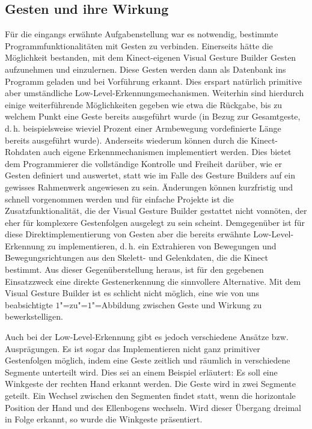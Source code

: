 \subsection{Gesten und ihre Wirkung}\label{sec:gesten}
Für die eingangs erwähnte Aufgabenstellung war es notwendig, bestimmte Programmfunktionalitäten mit Gesten zu verbinden. Einerseits hätte die Möglichkeit bestanden, mit dem Kinect-eigenen Visual Gesture Builder Gesten aufzunehmen und einzulernen. Diese Gesten werden dann als Datenbank ins Programm geladen und bei Vorführung erkannt. Dies erspart natürlich primitive aber umständliche Low-Level-Erkennungsmechanismen. Weiterhin sind hierdurch einige weiterführende Möglichkeiten gegeben wie etwa die Rückgabe, bis zu welchem Punkt eine Geste bereits ausgeführt wurde (in Bezug zur Gesamtgeste, d.\,h. beispielsweise wieviel Prozent einer Armbewegung vordefinierte Länge bereits ausgeführt wurde). Anderseits wiederum können durch die Kinect-Rohdaten auch eigene Erkennmechanismen implementiert werden. Dies bietet dem Programmierer die vollständige Kontrolle und Freiheit darüber, wie er Gesten definiert und auswertet, statt wie im Falle des Gesture Builders auf ein gewisses Rahmenwerk angewiesen zu sein. Änderungen können kurzfristig und schnell vorgenommen werden und für einfache Projekte ist die Zusatzfunktionalität, die der Visual Gesture Builder gestattet nicht vonnöten, der eher für komplexere Gestenfolgen ausgelegt zu sein scheint. Demgegenüber ist für diese Direktimplementierung von Gesten aber die bereits erwähnte Low-Level-Erkennung zu implementieren, d.\,h. ein Extrahieren von Bewegungen und Bewegungsrichtungen aus den Skelett- und Gelenkdaten, die die Kinect bestimmt. Aus dieser Gegenüberstellung heraus, ist für den gegebenen Einsatzzweck eine direkte Gestenerkennung die sinnvollere Alternative. Mit dem Visual Gesture Builder ist es schlicht nicht möglich, eine wie von uns beabsichtigte $1$"=zu"=$1$"=Abbildung zwischen Geste und Wirkung zu bewerkstelligen.\par 
	Auch bei der Low-Level-Erkennung gibt es jedoch verschiedene Ansätze bzw. Ausprägungen. Es ist sogar das Implementieren nicht ganz primitiver Gestenfolgen möglich, indem eine Geste zeitlich und räumlich in verschiedene Segmente unterteilt wird. Dies sei an einem Beispiel erläutert: Es soll eine Winkgeste der rechten Hand erkannt werden. Die Geste wird in zwei Segmente geteilt. Ein Wechsel zwischen den Segmenten findet statt, wenn die horizontale Position der Hand und des Ellenbogens wechseln. Wird dieser Übergang dreimal in Folge erkannt, so wurde die Winkgeste präsentiert.\par
